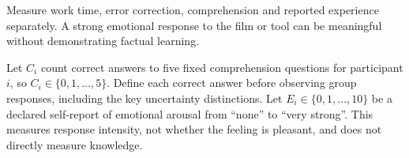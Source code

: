 Measure work time, error correction, comprehension and reported experience separately. A strong emotional response to the film or tool can be meaningful without demonstrating factual learning.

Let $C_i$ count correct answers to five fixed comprehension questions for participant $i$, so $C_i\in\{0,1,\ldots,5\}$. Define each correct answer before observing group responses, including the key uncertainty distinctions. Let $E_i\in\{0,1,\ldots,10\}$ be a declared self-report of emotional arousal from ``none'' to ``very strong''. This measures response intensity, not whether the feeling is pleasant, and does not directly measure knowledge.

